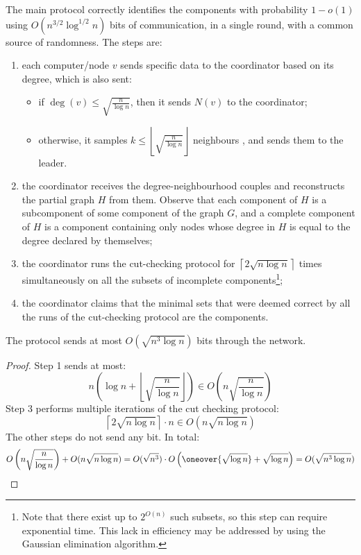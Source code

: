 The main protocol correctly identifies the components with probability $1 - o(1)$ using $O\left(n^{3/2} \log^{1/2} n\right)$ bits of communication, in a single round, with a common source of randomness. The steps are:
\begin{enumerate}
    \item each computer/node $v$ sends specific data to the coordinator based on its degree, which is also sent:
    \begin{itemize}
        \item if $\deg(v) \leq \sqrt{\frac{n}{\log n}}$, then it sends $N(v)$ to the coordinator;
        \item otherwise, it samples $k \leq \left\lfloor \sqrt{\frac{n}{\log n}} \right\rfloor$ neighbours \uar{}, and sends them to the leader.
    \end{itemize}
    \item the coordinator receives the degree-neighbourhood couples and reconstructs the partial graph $H$ from them. Observe that each component of $H$ is a subcomponent of some component of the graph $G$, and a complete component of $H$ is a component containing only nodes whose degree in $H$ is equal to the degree declared by themselves;
    \item the coordinator runs the cut-checking protocol for $\left\lceil 2 \sqrt{n \log n} \right\rceil$ times simultaneously on all the subsets of incomplete components\footnote{Note that there exist up to $2^{O(n)}$ such subsets, so this step can require exponential time. This lack in efficiency may be addressed by using the Gaussian elimination algorithm.};
    \item the coordinator claims that the minimal sets that were deemed correct by all the runs of the cut-checking protocol are the components.
\end{enumerate}

\begin{lemma}
    The protocol sends at most $O(\sqrt{n^3 \log n})$ bits through the network.
\end{lemma}

\begin{proof}
    Step 1 sends at most:
    \[
        n \left( \log n + \left\lfloor \sqrt{\frac{n}{\log n}} \right\rfloor \right) \in O \left( n \sqrt{\frac{n}{\log n}} \right)
    \]
    Step 3 performs multiple iterations of the cut checking protocol:
    \[
        \left\lceil 2 \sqrt{n \log n} \right\rceil \cdot n \in O(n \sqrt{n \log n})
    \]
    The other steps do not send any bit. In total:
    \[
        O \left( n \sqrt{\frac{n}{\log n}} \right) + O(n \sqrt{n \log n}) = O(\sqrt{n^3}) \cdot O \left( \oneover{\sqrt{\log n}} + \sqrt{\log n} \right) = O(\sqrt{n^3 \log n})
    \]
\end{proof}

